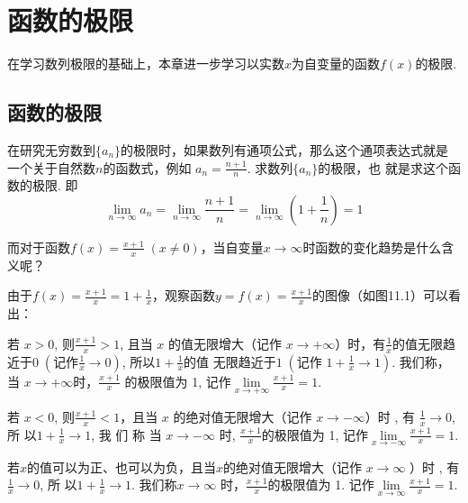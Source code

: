 \chapter{函数的极限}


在学习数列极限的基础上，本章进一步学习以实数$x$为自变量的函数$f(x)$的极限.

\section{函数的极限}
在研究无穷数到$\{a_n\}$的极限时，如果数列有通项公式，那么这个通项表达式就是一个关于自然数$n$的函数式，例如
$a_n=\frac{n+1}{n}$. 求数列$\{a_n\}$的极限，也
就是求这个函数的极限. 即
\[\lim_{n\to\infty}a_n = \lim_{n\to\infty}\frac{n+1}{n}=\lim_{n\to\infty}\left(1+\frac{1}{n}\right)=1\]

而对于函数$f(x)=\frac{x+1}{x}\; (x\ne 0)$，当自变量$x\to \infty$时函数的变化趋势是什么含义呢？

由于$f(x)=\frac{x+1}{x}=1+\frac{1}{x}$，观察函数$y=f(x)=\frac{x+1}{x}$的图像（如图11.1）可以看出：
\begin{figure}[htp]
    \centering
{}
    \caption{}
\end{figure}



若 $x>0$, 则$\frac{x+1}x>1$, 且当 $x$ 的值无限增大（记作 $x\to+\infty$）时，有$\frac{1}{x}$的值无限趋近于$0\; \left(\text{记作}\frac{1}{x}\to 0\right)$, 所以$1+\frac{1}{x}$的值
无限趋近于$1\; \left(\text{记作 }1+\frac1x\to1\right)$. 我们称，当 $x\to+\infty$时，$\frac{x+1}x$ 的极限值为 1, 记作$\lim\limits_{x\to+\infty}\frac{x+1}{x}=1$.

若 $x< 0$, 则$\frac{x+1}x<1$，且当 $x$ 的绝对值无限增大（记作 $x\to -\infty$）时 , 有 $\frac 1x\to 0$, 所 以$1+ \frac 1x\to 1$, 我 们 称 当 $x\to -\infty$ 时, $\frac{x+1}{x}$的极限值为 1, 记作$\lim\limits_{x\to-\infty}\frac{x+1}{x}=1$.

若$x$的值可以为正、也可以为负，且当$x$的绝对值无限增大（记作 $x\to \infty$ ）时 , 有$\frac 1x\to 0$, 所 以$1+ \frac 1x\to 1$. 我们称$x\to\infty$ 时，$\frac{x+1}x$的极限值为 1. 记作$\lim\limits_{x\to\infty}\frac{x+1}x=1$.

